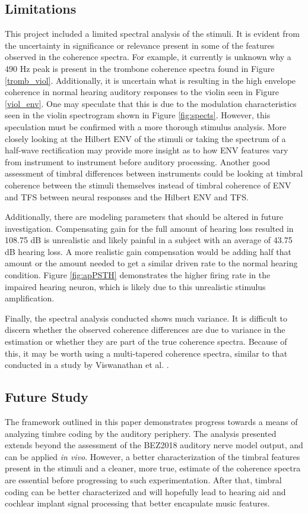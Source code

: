 \documentclass[conference]{IEEEtran}
\begin{document}
\subsection{Limitations}
This project included a limited spectral analysis of the stimuli. It is evident from the uncertainty in significance or relevance present in some of the features observed in the coherence spectra. For example, it currently is unknown why a 490 Hz peak is present in the trombone coherence spectra found in Figure \ref{tromb_viol}. Additionally, it is uncertain what is resulting in the high envelope coherence in normal hearing auditory responses to the violin seen in Figure \ref{viol_env}. One may speculate that this is due to the modulation characteristics seen in the violin spectrogram shown in Figure \ref{fig:spects}. However, this speculation must be confirmed with a more thorough stimulus analysis. More closely looking at the Hilbert ENV of the stimuli or taking the spectrum of a half-wave rectification may provide more insight as to how ENV features vary from instrument to instrument before auditory processing. Another good assessment of timbral differences between instruments could be looking at timbral coherence between the stimuli themselves instead of timbral coherence of ENV and TFS between neural responses and the Hilbert ENV and TFS. 

Additionally, there are modeling parameters that should be altered in future investigation. Compensating gain for the full amount of hearing loss resulted in 108.75 dB is unrealistic and likely painful in a subject with an average of 43.75 dB hearing loss. A more realistic gain compensation would be adding half that amount or the amount needed to get a similar driven rate to the normal hearing condition. Figure \ref{fig:apPSTH} demonstrates the higher firing rate in the impaired hearing neuron, which is likely due to this unrealistic stimulus amplification.  

Finally, the spectral analysis conducted shows much variance. It is difficult to discern whether the observed coherence differences are due to variance in the estimation or whether they are part of the true coherence spectra. Because of this, it may be worth using a multi-tapered coherence spectra, similar to that conducted in a study by Viswanathan et al. \cite{viswanathan_electroencephalographic_2019}. 

\subsection{Future Study}
The framework outlined in this paper demonstrates progress towards a means of analyzing timbre coding by the auditory periphery. The analysis presented extends beyond the assessment of the BEZ2018 auditory nerve model output, and can be applied \textit{in vivo}. However, a better characterization of the timbral features present in the stimuli and a cleaner, more true, estimate of the coherence spectra are essential before progressing to such experimentation. After that, timbral coding can be better characterized and will hopefully lead to hearing aid and cochlear implant signal processing that better encapulate music features.
\end{document}
